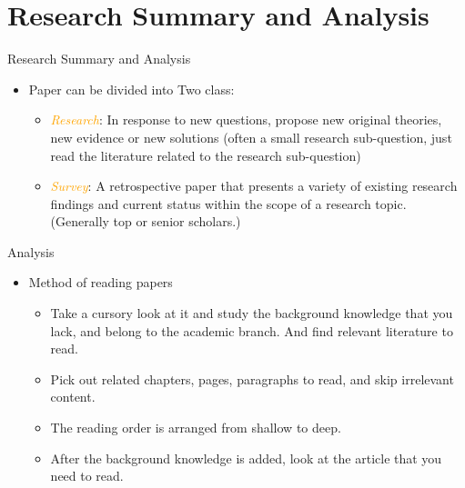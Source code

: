 \documentclass[
 size=14pt,
 paper=smartboard,  %
 mode=present, 		%
 display=slides, 	%
 style=tuliplab,  	%
 pauseslide,
 fleqn,leqno]{powerdot}{}
\begin{document}
\section{Research Summary and Analysis}

\begin{slide}[toc=,bm=]{Research Summary and Analysis}

\begin{itemize}
  \item Paper can be divided into Two class:
  \begin{itemize}
    \item  \textcolor{orange}{\textit{Research}}: In response to new questions, propose new original theories, new evidence or new solutions (often a small research sub-question, just read the literature related to the research sub-question)
    \item  \textcolor{orange}{\textit{Survey}}: A retrospective paper that presents a variety of existing research findings and current status within the scope of a research topic. (Generally top or senior scholars.)
  \end{itemize}
\end{itemize}
\end{slide}

\begin{slide}{Analysis}

\begin{itemize}
    \item Method of reading papers
    \begin{itemize}
      \item Take a cursory look at it and study the background knowledge that you lack, and belong to the academic branch. And find relevant literature to read.
      \item  Pick out related chapters, pages, paragraphs to read, and skip irrelevant content.
      \item The reading order is arranged from shallow to deep.
      \item After the background knowledge is added, look at the article that you need to read.
    \end{itemize}
\end{itemize}
\end{slide}
\end{document}
